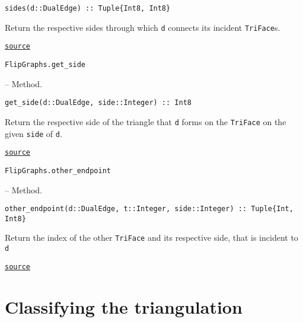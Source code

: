 \begin{adjustwidth}{2em}{0pt}


\begin{verbatim}
sides(d::DualEdge) :: Tuple{Int8, Int8}
\end{verbatim}

Return the respective sides through which \texttt{d} connects its incident \texttt{TriFace}s.



\href{https://github.com/schto223/FlipGraphs.jl/blob/490c01a7adf74b42f27dda05099165c47ae8133e/src/deltaComplex.jl#L111-L115}{\texttt{source}}


\end{adjustwidth}
\hypertarget{4112526725817145726}{\texttt{FlipGraphs.get\_side}}  -- {Method.}

\begin{adjustwidth}{2em}{0pt}


\begin{verbatim}
get_side(d::DualEdge, side::Integer) :: Int8
\end{verbatim}

Return the respective side of the triangle that \texttt{d} forms on the \texttt{TriFace} on the given \texttt{side} of \texttt{d}.



\href{https://github.com/schto223/FlipGraphs.jl/blob/490c01a7adf74b42f27dda05099165c47ae8133e/src/deltaComplex.jl#L118-L122}{\texttt{source}}


\end{adjustwidth}
\hypertarget{15748626811343085304}{\texttt{FlipGraphs.other\_endpoint}}  -- {Method.}

\begin{adjustwidth}{2em}{0pt}


\begin{verbatim}
other_endpoint(d::DualEdge, t::Integer, side::Integer) :: Tuple{Int, Int8}
\end{verbatim}

Return the index of the other \texttt{TriFace} and its respective side, that is incident to \texttt{d} 



\href{https://github.com/schto223/FlipGraphs.jl/blob/490c01a7adf74b42f27dda05099165c47ae8133e/src/deltaComplex.jl#L167-L171}{\texttt{source}}


\end{adjustwidth}

\section{Classifying the triangulation}



